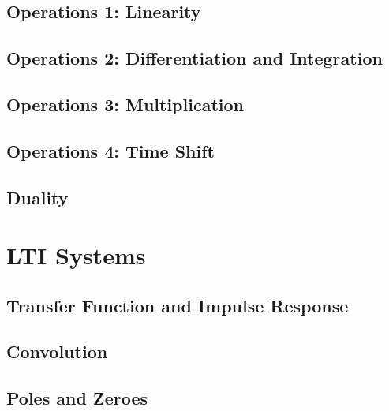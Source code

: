 \begin{refsection}
\subsection{Operations 1: Linearity}

\subsection{Operations 2: Differentiation and Integration}

\subsection{Operations 3: Multiplication}

\subsection{Operations 4: Time Shift}

\subsection{Duality}

\section{\acs{LTI} Systems}

\subsection{Transfer Function and Impulse Response}

\subsection{Convolution}

\subsection{Poles and Zeroes}

\printbibliography[heading=subbibliography]
\end{refsection}

